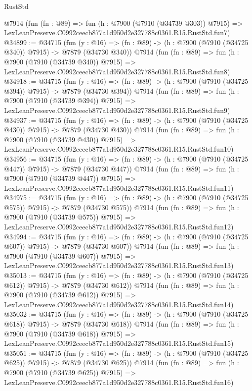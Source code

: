 \begin{lexlean}{RustStd}
\begin{coremodule}
    @7914
    (fun (fn : @89) =>
    fun (h : @7900 (@7910 (@34739 @303)) @7915) =>
    LexLeanPreserve.C0992ceecb877a1d950d2e327788c0361.R15.RustStd.fun7)
@34899 := @34715
    (fun (y : @16) => (fn : @89) -> (h : @7900 (@7910 (@34725 @340)) @7915) -> @7879 (@34730 @340))
    @7914
    (fun (fn : @89) =>
    fun (h : @7900 (@7910 (@34739 @340)) @7915) =>
    LexLeanPreserve.C0992ceecb877a1d950d2e327788c0361.R15.RustStd.fun8)
@34918 := @34715
    (fun (y : @16) => (fn : @89) -> (h : @7900 (@7910 (@34725 @394)) @7915) -> @7879 (@34730 @394))
    @7914
    (fun (fn : @89) =>
    fun (h : @7900 (@7910 (@34739 @394)) @7915) =>
    LexLeanPreserve.C0992ceecb877a1d950d2e327788c0361.R15.RustStd.fun9)
@34937 := @34715
    (fun (y : @16) => (fn : @89) -> (h : @7900 (@7910 (@34725 @430)) @7915) -> @7879 (@34730 @430))
    @7914
    (fun (fn : @89) =>
    fun (h : @7900 (@7910 (@34739 @430)) @7915) =>
    LexLeanPreserve.C0992ceecb877a1d950d2e327788c0361.R15.RustStd.fun10)
@34956 := @34715
    (fun (y : @16) => (fn : @89) -> (h : @7900 (@7910 (@34725 @447)) @7915) -> @7879 (@34730 @447))
    @7914
    (fun (fn : @89) =>
    fun (h : @7900 (@7910 (@34739 @447)) @7915) =>
    LexLeanPreserve.C0992ceecb877a1d950d2e327788c0361.R15.RustStd.fun11)
@34975 := @34715
    (fun (y : @16) => (fn : @89) -> (h : @7900 (@7910 (@34725 @575)) @7915) -> @7879 (@34730 @575))
    @7914
    (fun (fn : @89) =>
    fun (h : @7900 (@7910 (@34739 @575)) @7915) =>
    LexLeanPreserve.C0992ceecb877a1d950d2e327788c0361.R15.RustStd.fun12)
@34994 := @34715
    (fun (y : @16) => (fn : @89) -> (h : @7900 (@7910 (@34725 @607)) @7915) -> @7879 (@34730 @607))
    @7914
    (fun (fn : @89) =>
    fun (h : @7900 (@7910 (@34739 @607)) @7915) =>
    LexLeanPreserve.C0992ceecb877a1d950d2e327788c0361.R15.RustStd.fun13)
@35013 := @34715
    (fun (y : @16) => (fn : @89) -> (h : @7900 (@7910 (@34725 @612)) @7915) -> @7879 (@34730 @612))
    @7914
    (fun (fn : @89) =>
    fun (h : @7900 (@7910 (@34739 @612)) @7915) =>
    LexLeanPreserve.C0992ceecb877a1d950d2e327788c0361.R15.RustStd.fun14)
@35032 := @34715
    (fun (y : @16) => (fn : @89) -> (h : @7900 (@7910 (@34725 @618)) @7915) -> @7879 (@34730 @618))
    @7914
    (fun (fn : @89) =>
    fun (h : @7900 (@7910 (@34739 @618)) @7915) =>
    LexLeanPreserve.C0992ceecb877a1d950d2e327788c0361.R15.RustStd.fun15)
@35051 := @34715
    (fun (y : @16) => (fn : @89) -> (h : @7900 (@7910 (@34725 @625)) @7915) -> @7879 (@34730 @625))
    @7914
    (fun (fn : @89) =>
    fun (h : @7900 (@7910 (@34739 @625)) @7915) =>
    LexLeanPreserve.C0992ceecb877a1d950d2e327788c0361.R15.RustStd.fun16)

\end{coremodule}
\end{lexlean}
